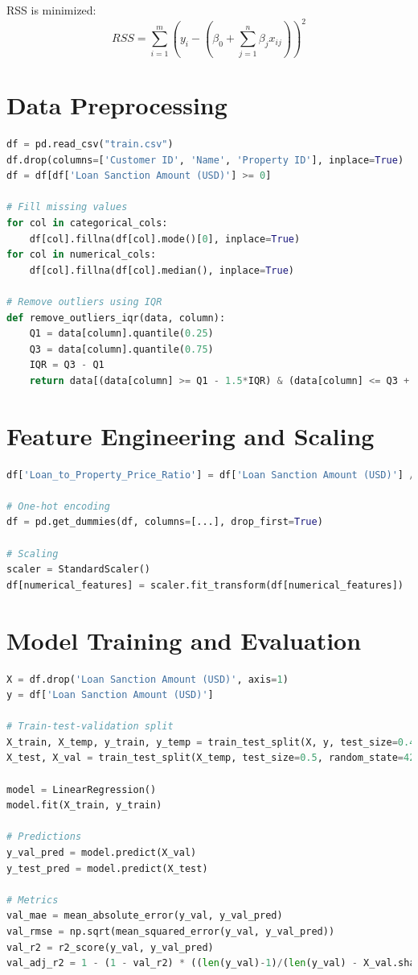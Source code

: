 \documentclass[12pt]{article}
\begin{document}
RSS is minimized:
\[
RSS = \sum_{i=1}^{m} \left( y_i - \left( \beta_0 + \sum_{j=1}^{n} \beta_j x_{ij} \right) \right)^2
\]

\section{Data Preprocessing}
\begin{lstlisting}[language=Python, caption=Dataset Loading and Cleaning]
df = pd.read_csv("train.csv")
df.drop(columns=['Customer ID', 'Name', 'Property ID'], inplace=True)
df = df[df['Loan Sanction Amount (USD)'] >= 0]

# Fill missing values
for col in categorical_cols:
    df[col].fillna(df[col].mode()[0], inplace=True)
for col in numerical_cols:
    df[col].fillna(df[col].median(), inplace=True)

# Remove outliers using IQR
def remove_outliers_iqr(data, column):
    Q1 = data[column].quantile(0.25)
    Q3 = data[column].quantile(0.75)
    IQR = Q3 - Q1
    return data[(data[column] >= Q1 - 1.5*IQR) & (data[column] <= Q3 + 1.5*IQR)]
\end{lstlisting}

\section{Feature Engineering and Scaling}
\begin{lstlisting}[language=Python, caption=Feature Engineering and Scaling]
df['Loan_to_Property_Price_Ratio'] = df['Loan Sanction Amount (USD)'] / df['Property Price']

# One-hot encoding
df = pd.get_dummies(df, columns=[...], drop_first=True)

# Scaling
scaler = StandardScaler()
df[numerical_features] = scaler.fit_transform(df[numerical_features])
\end{lstlisting}

\section{Model Training and Evaluation}
\begin{lstlisting}[language=Python, caption=Linear Regression and Metrics]
X = df.drop('Loan Sanction Amount (USD)', axis=1)
y = df['Loan Sanction Amount (USD)']

# Train-test-validation split
X_train, X_temp, y_train, y_temp = train_test_split(X, y, test_size=0.4, random_state=42)
X_test, X_val = train_test_split(X_temp, test_size=0.5, random_state=42)

model = LinearRegression()
model.fit(X_train, y_train)

# Predictions
y_val_pred = model.predict(X_val)
y_test_pred = model.predict(X_test)

# Metrics
val_mae = mean_absolute_error(y_val, y_val_pred)
val_rmse = np.sqrt(mean_squared_error(y_val, y_val_pred))
val_r2 = r2_score(y_val, y_val_pred)
val_adj_r2 = 1 - (1 - val_r2) * ((len(y_val)-1)/(len(y_val) - X_val.shape[1] - 1))
\end{lstlisting}
\end{document}
